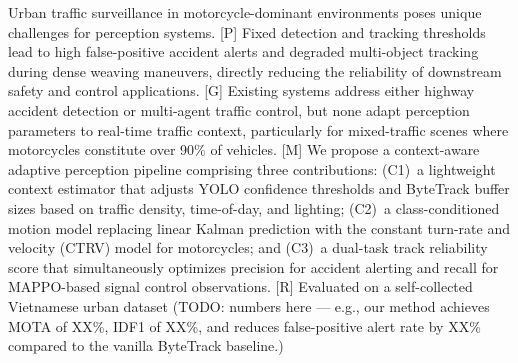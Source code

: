 
Urban traffic surveillance in motorcycle-dominant environments poses
unique challenges for perception systems.
%
[P] Fixed detection and tracking thresholds lead to high false-positive
accident alerts and degraded multi-object tracking during dense weaving
maneuvers, directly reducing the reliability of downstream safety and
control applications.
%
[G] Existing systems address either highway accident detection or
multi-agent traffic control, but none adapt perception parameters to
real-time traffic context, particularly for mixed-traffic scenes where
motorcycles constitute over 90\% of vehicles.
%
[M] We propose a context-aware adaptive perception pipeline comprising
three contributions: (C1)~a lightweight context estimator that adjusts
YOLO confidence thresholds and ByteTrack buffer sizes based on traffic
density, time-of-day, and lighting; (C2)~a class-conditioned motion
model replacing linear Kalman prediction with the constant turn-rate and
velocity (CTRV) model for motorcycles; and (C3)~a dual-task track
reliability score that simultaneously optimizes precision for accident
alerting and recall for MAPPO-based signal control observations.
%
[R] Evaluated on a self-collected Vietnamese urban dataset
(TODO: numbers here --- e.g., our method achieves MOTA of XX\%,
IDF1 of XX\%, and reduces false-positive alert rate by XX\%
compared to the vanilla ByteTrack baseline.)
